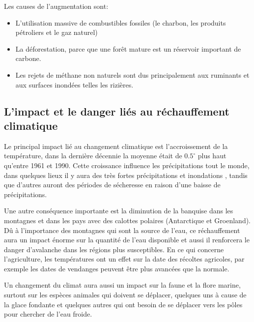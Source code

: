 \documentclass[a4paper,10pt]{article}
\begin{document}
Les causes de l’augmentation sont:

\begin{itemize}

\item L'utilisation massive de combustibles fossiles (le charbon, les produits
  pétroliers et le gaz naturel)

\item La déforestation, parce que une forêt mature est un réservoir important de
  carbone.

\item  Les  rejets  de  méthane non naturels  sont  dus  principalement  aux
  ruminants et aux surfaces inondées telles les rizières.

\end{itemize}



\subsection{L’impact et le danger liés au réchauffement climatique}

Le principal impact lié au changement climatique est l'accroissement de la
température, dans la dernière décennie la moyenne était {\color{red}de} $0.5^{\circ}$ plus haut
{\color{red}qu'entre} 1961 et 1990. Cette  croissance influence les  précipitations tout le
monde,  dans quelques {\color{red}lieux} il  y aura  des très fortes précipitations et inondations , tandis  que {\color{red}d'}autres auront  des périodes de sécheresse en raison d'une baisse de précipitations.

Une  autre conséquence  importante est  la diminution  de la  banquise  dans les
montagnes et dans les pays avec {\color{red}des} calottes polaires (Antarctique et Groenland). Dû à l’importance des montagnes qui sont la source de l'eau, ce réchauffement aura un impact énorme {\color{red}sur} la quantité de l'eau disponible et aussi il renforce{\color{red}ra} le danger d’avalanche dans les régions plus susceptibles. {\color{red}En} ce qui concerne l'agriculture, les températures ont un effet sur la date des récoltes agricoles, par exemple les dates de vendanges peuvent être plus avancées que {\color{red}la normale}.
 
Un changement  du climat aura  aussi un impact  sur {\color{red}la} faune  et la
flore marine, surtout sur les espèces animales qui doivent se déplacer, quelques
uns  à cause  de la  glace fondante  et  quelques autres  qui ont  besoin de  se
déplacer {\color{red}vers les} pôles {\color{red}pour chercher de} l’eau froide.
\end{document}

